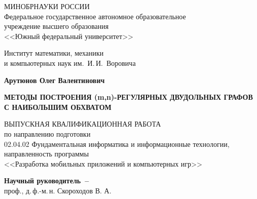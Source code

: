 


\thispagestyle{empty}
\begin{singlespacing} 
\begin{center}

МИНОБРНАУКИ РОССИИ\\ [12pt]
Федеральное государственное автономное образовательное\\
учреждение высшего образования\\
<<Южный федеральный университет>>

\vspace{\baselineskip}
Институт математики, механики\\
и компьютерных наук им.~И.\,И.~Воровича


\vfill
\textbf{Арутюнов Олег Валентинович}

\vspace{15mm}
{\bf МЕТОДЫ ПОСТРОЕНИЯ (m,n)-РЕГУЛЯРНЫХ ДВУДОЛЬНЫХ ГРАФОВ С НАИБОЛЬШИМ ОБХВАТОМ }

\vspace{15mm}
ВЫПУСКНАЯ КВАЛИФИКАЦИОННАЯ РАБОТА\\
по направлению подготовки\\
02.04.02 Фундаментальная информатика и информационные технологии,\\
направленность программы\\
<<Разработка мобильных приложений и компьютерных игр>>

\vspace{10mm}
\textbf{Научный руководитель~--}\\
проф., д.\,ф.-м.\,н. Скороходов В. А.



\vspace{15mm}


\end{center}
\end{singlespacing}
